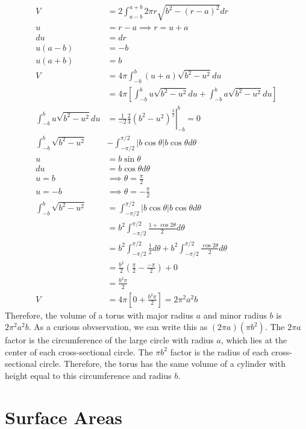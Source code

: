\documentclass[fleqn]{report}
\begin{document}
\begin{example}
\begin{align*}
V & = 2 \int_{a-b}^{a+b} 2\pi r \sqrt{b^2 - (r-a)^2} dr \\
u & = r-a \implies r = u+a\\
du & = dr \\
u(a-b) & = -b \\
u(a+b) & = b \\
V & = 4\pi \int_{-b}^b (u+a) \sqrt{b^2 - u^2} du \\
& = 4\pi \left[ \int_{-b}^b u \sqrt{b^2-u^2} du + \int_{-b}^b a
\sqrt{b^2-u^2} du \right] \\
\int_{-b}^b u \sqrt{b^2-u^2}du & = \left. \frac{1}{-2}
\frac{2}{3} (b^2 -u^2)^{\frac{3}{2}} \right|_{-b}^b = 0 \\
\int_{-b}^b \sqrt{b^2 - u^2} & - \int_{-\pi/2}^{\pi/2} |b\cos
\theta| b \cos \theta d\theta \\
u & = b \sin \theta \\
du & = b \cos \theta d \theta \\
u = b & \implies \theta = \frac{\pi}{2} \\
u = - b & \implies \theta = - \frac{\pi}{2} \\
\int_{-b}^b \sqrt{b^2 - u^2} & = \int_{-\pi/2}^{\pi/2} |b\cos
\theta| b \cos \theta d\theta \\
& = b^2 \int_{-\pi/2}^{\pi/2} \frac{1 + \cos 2\theta}{2} d
\theta \\
& = b^2 \int_{-\pi/2}^{\pi/2} \frac{1}{2} d\theta+ b^2
\int_{-\pi/2}^{\pi/2} \frac{\cos 2\theta}{2} d\theta \\
& = \frac{b^2}{2} \left( \frac{\pi}{2} - \frac{-\pi}{2} \right) + 0 \\
& = \frac{b^2\pi}{2} \\
V & = 4\pi \left[ 0 + \frac{b^2 \pi}{2} \right] = 2\pi^2 a^2 b
\end{align*}
Therefore, the volume of a torus with major radius $a$ and
minor radius $b$ is $2\pi^2 a^2 b$. As a curious obvservation,
we can write this as $(2\pi a)(\pi b^2)$. The $2\pi a$ factor
is the circumference of the large circle with radius $a$,
which lies at the center of each cross-sectional circle. The
$\pi b^2$ factor is the radius of each cross-sectional circle.
Therefore, the torus has the same volume of a cylinder with
height equal to this circumference and radius $b$.
\end{example}

\section{Surface Areas}
\label{surface-areas}
\end{document}
